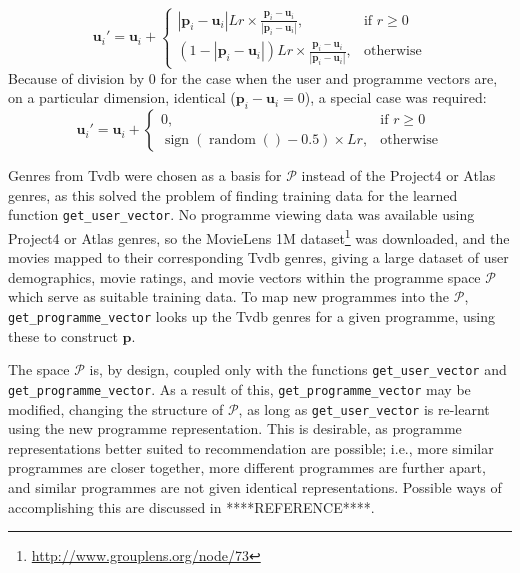 $$
	\mathbf{u}_{i}' =
	\mathbf{u}_{i} + \begin{cases}
		\left|\mathbf{p}_{i}-\mathbf{u}_{i}\right|Lr \times \frac{\mathbf{p}_{i}-\mathbf{u}_{i}}{\left|\mathbf{p}_{i}-\mathbf{u}_{i}\right|},&
			\text{if } r\geq 0\\
		(1-\left|\mathbf{p}_{i}-\mathbf{u}_{i}\right|)Lr \times \frac{\mathbf{p}_{i}-\mathbf{u}_{i}}{\left|\mathbf{p}_{i}-\mathbf{u}_{i}\right|},&
			\text{otherwise}
	\end{cases}
$$
Because of division by 0 for the case when the user and programme vectors are, on a particular dimension, identical ($\mathbf{p}_{i}-\mathbf{u}_{i}=0$), a special case was required:
$$
	\mathbf{u}_{i}' =
	\mathbf{u}_{i} + \begin{cases}
		0,&
			\text{if } r\geq 0\\
		\operatorname{sign}(\operatorname{random}()-0.5)\times Lr,&
			\text{otherwise}
	\end{cases}
$$

Genres from Tvdb were chosen as a basis for $\mathcal{P}$ instead of the Project4 or Atlas genres, as this solved the problem of finding training data for the learned function \texttt{get\_user\_vector}. No programme viewing data was available using Project4 or Atlas genres, so the MovieLens 1M dataset\footnote{\url{http://www.grouplens.org/node/73}} was downloaded, and the movies mapped to their corresponding Tvdb genres, giving a large dataset of user demographics, movie ratings, and movie vectors within the programme space $\mathcal{P}$ which serve as suitable training data. To map new programmes into the $\mathcal{P}$, \texttt{get\_programme\_vector} looks up the Tvdb genres for a given programme, using these to construct $\mathbf{p}$.

The space $\mathcal{P}$ is, by design, coupled only with the functions \texttt{get\_user\_vector} and \texttt{get\_programme\_vector}. As a result of this, \texttt{get\_programme\_vector} may be modified, changing the structure of $\mathcal{P}$, as long as \texttt{get\_user\_vector} is re-learnt using the new programme representation. This is desirable, as programme representations better suited to recommendation are possible; i.e., more similar programmes are closer together, more different programmes are further apart, and similar programmes are not given identical representations. Possible ways of accomplishing this are discussed in ****REFERENCE****.


